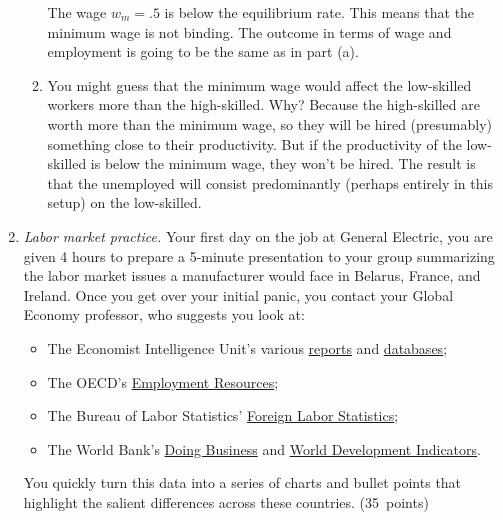\documentclass[letterpaper,12pt]{article}
\begin{document}
\begin{enumerate}
\begin{enumerate}

The wage $w_{m}=.5$ is below the equilibrium rate. This means that
the minimum wage is not binding. The outcome in terms of wage and
employment is going to be the same as in part (a).

\item You might guess that the minimum wage would  affect 
the low-skilled workers more than the high-skilled. 
Why?  Because the high-skilled are worth more than the minimum 
wage, so they will be hired (presumably) something close to their 
productivity.
But if the productivity of the low-skilled is below the minimum wage, 
they won't be hired. 
The result is that the unemployed will consist predominantly 
(perhaps entirely in this setup) 
on the low-skilled. 

\end{enumerate}

\item {\it Labor market practice.\/}  
Your first day on the job at General Electric, 
you are given 4 hours to prepare
a 5-minute presentation to your group summarizing the 
labor market issues a manufacturer would face in 
Belarus, France, and Ireland.   
Once you get over your initial panic, you contact your Global Economy 
professor, who suggests you look at:    
%
\begin{itemize}
\item The Economist Intelligence Unit's various 
\href{http://db.eiu.com/topic_view.asp?pubcode=CP&title=Country+Profile}{reports} 
and 
\href{http://www.countrydata.bvdep.com/cgi/template.dll?product=101&user=ipaddress}
{databases};


\item The OECD's  \href{http://www.oecd.org/topic/0,2686,en_2649_37457_1_1_1_1_37457,00.html} {Employment Resources}; 

\item The Bureau of Labor Statistics'
\href{http://www.bls.gov/fls/hcompsupptabtoc.htm}{Foreign Labor Statistics};

\item The World Bank's
\href{http://www.doingbusiness.org/}
{Doing Business} 
and
\href{http://devdata.worldbank.org/dataonline/}
{World Development Indicators}.  

\end{itemize}
%
You quickly turn this data into a series of charts and bullet points 
that highlight the salient differences across these countries.  (35~points) 


\end{enumerate}
\end{document}
